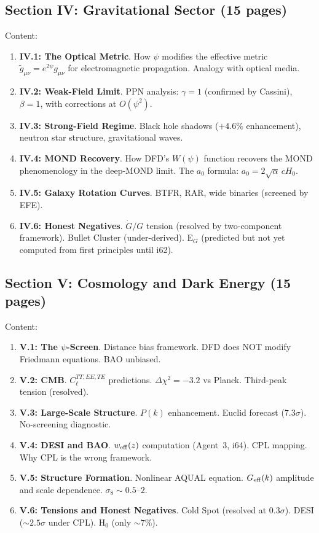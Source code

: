 \documentclass[11pt,a4paper]{article}
\begin{document}
\subsection{Section IV: Gravitational Sector (15 pages)}

Content:
\begin{enumerate}
\item \textbf{IV.1: The Optical Metric}. How $\psi$ modifies the effective metric $\tilde{g}_{\mu\nu} = e^{2\psi}g_{\mu\nu}$ for electromagnetic propagation. Analogy with optical media.
\item \textbf{IV.2: Weak-Field Limit}. PPN analysis: $\gamma = 1$ (confirmed by Cassini), $\beta = 1$, with corrections at $O(\psi^2)$.
\item \textbf{IV.3: Strong-Field Regime}. Black hole shadows ($+4.6\%$ enhancement), neutron star structure, gravitational waves.
\item \textbf{IV.4: MOND Recovery}. How DFD's $W(\psi)$ function recovers the MOND phenomenology in the deep-MOND limit. The $a_0$ formula: $a_0 = 2\sqrt{\alpha}\,cH_0$.
\item \textbf{IV.5: Galaxy Rotation Curves}. BTFR, RAR, wide binaries (screened by EFE).
\item \textbf{IV.6: Honest Negatives}. $\dot{G}/G$ tension (resolved by two-component framework). Bullet Cluster (under-derived). E$_G$ (predicted but not yet computed from first principles until i62).
\end{enumerate}

\subsection{Section V: Cosmology and Dark Energy (15 pages)}

Content:
\begin{enumerate}
\item \textbf{V.1: The $\psi$-Screen}. Distance bias framework. DFD does NOT modify Friedmann equations. BAO unbiased.
\item \textbf{V.2: CMB}. $C_\ell^{TT,EE,TE}$ predictions. $\Delta\chi^2 = -3.2$ vs Planck. Third-peak tension (resolved).
\item \textbf{V.3: Large-Scale Structure}. $P(k)$ enhancement. Euclid forecast ($7.3\sigma$). No-screening diagnostic.
\item \textbf{V.4: DESI and BAO}. $w_{\rm eff}(z)$ computation (Agent~3, i64). CPL mapping. Why CPL is the wrong framework.
\item \textbf{V.5: Structure Formation}. Nonlinear AQUAL equation. $G_{\rm eff}(k)$ amplitude and scale dependence. $\sigma_8 \sim 0.5$--$2$.
\item \textbf{V.6: Tensions and Honest Negatives}. Cold Spot (resolved at $0.3\sigma$). DESI ($\sim 2.5\sigma$ under CPL). H$_0$ (only $\sim 7\%$).
\end{enumerate}
\end{document}
